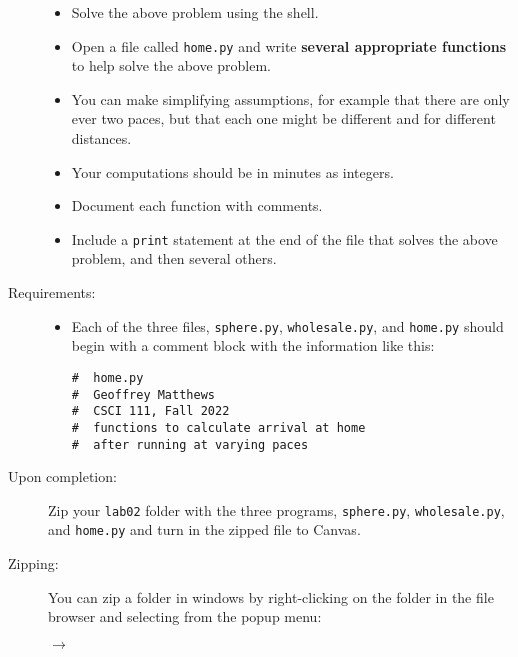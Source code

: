 \documentclass[12pt]{article}
\begin{document}
\begin{description}
\begin{itemize}

\item Solve the above problem using the shell.
\item Open a file called \verb|home.py|
and write {\bf several appropriate functions} to help
 solve the above problem.
\item You can make simplifying assumptions,
for example that there are only ever two
paces, but that each one might be different and for
different distances.
\item Your computations should be in minutes as integers.
\item Document each function with comments.
\item Include a \verb|print| statement at the end of the file
that solves the above problem, and then several others.
\end{itemize}

\item[Requirements:]
\begin{itemize}
\item
Each of the three files, \verb|sphere.py|,
\verb|wholesale.py|, and \verb|home.py|
should begin with a comment block with
the information like this:
\begin{lstlisting}
#  home.py
#  Geoffrey Matthews
#  CSCI 111, Fall 2022
#  functions to calculate arrival at home
#  after running at varying paces
\end{lstlisting}
\begin{center}
\end{center}

\end{itemize}

\item[Upon completion:] Zip your \verb|lab02| folder
with the three programs, \verb|sphere.py|,
\verb|wholesale.py|, and \verb|home.py|
and turn in the zipped file to Canvas.

\item[Zipping:] You can zip a folder in windows by right-clicking
on the folder in the file browser and selecting from the popup menu:

\ensuremath{\rightarrow}


\end{description}
\end{document}

